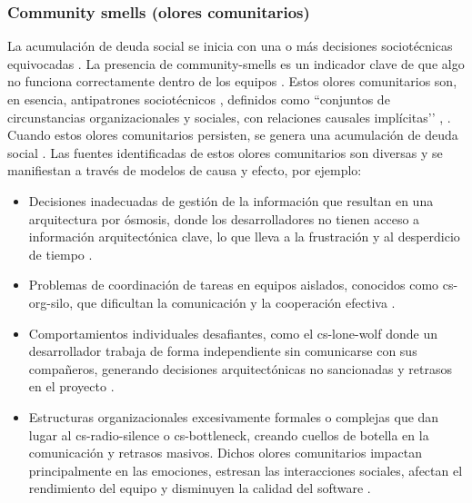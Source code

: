 \subsubsection{Community smells (olores comunitarios)}
La acumulación de deuda social se inicia con una o más decisiones sociotécnicas equivocadas \cite{caballero2022communitysmells}. La presencia de \gls{community-smells} es un indicador clave de que algo no funciona correctamente dentro de los equipos \cite{caballero2022communitysmells}. Estos olores comunitarios son, en esencia, antipatrones sociotécnicos \cite{caballero2022communitysmells}, definidos como ``conjuntos de circunstancias organizacionales y sociales, con relaciones causales implícitas’’ \cite{caballero2022communitysmells}, \cite{tamburri2015insights}. Cuando estos olores comunitarios persisten, se genera una acumulación de deuda social \cite{caballero2022communitysmells}. Las fuentes identificadas de estos olores comunitarios son diversas y se manifiestan a través de modelos de causa y efecto, por ejemplo:
\begin{itemize}
    \item Decisiones inadecuadas de gestión de la información que resultan en una arquitectura por ósmosis, donde los desarrolladores no tienen acceso a información arquitectónica clave, lo que lleva a la frustración y al desperdicio de tiempo \cite{caballero2022communitysmells}.
    \item Problemas de coordinación de tareas en equipos aislados, conocidos como \gls{cs-org-silo}, que dificultan la comunicación y la cooperación efectiva \cite{caballero2022communitysmells}.
    \item Comportamientos individuales desafiantes, como el \gls{cs-lone-wolf} donde un desarrollador trabaja de forma independiente sin comunicarse con sus compañeros, generando decisiones arquitectónicas no sancionadas y retrasos en el proyecto \cite{caballero2022communitysmells}.
    \item Estructuras organizacionales excesivamente formales o complejas que dan lugar al \gls{cs-radio-silence} o \gls{cs-bottleneck}, creando cuellos de botella en la comunicación y retrasos masivos. Dichos olores comunitarios impactan principalmente en las emociones, estresan las interacciones sociales, afectan el rendimiento del equipo y disminuyen la calidad del software \cite{caballero2022communitysmells}.
\end{itemize}


